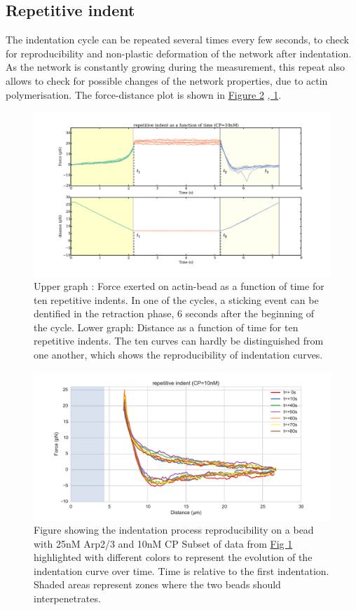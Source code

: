 \documentclass[A4paperpaper,11pt,english]{sphinxmanual}
\begin{document}
\subsection{Repetitive indent}
\label{index-latex:repetitive-indent}
The indentation cycle can be repeated several times every few seconds, to check for reproducibility and non-plastic deformation of the network after
indentation. As the network is constantly growing during the measurement, this
repeat also allows to check for possible changes of the network properties, due to actin
polymerisation. The force-distance plot is shown in \hyperref[index-latex:reproc]{Figure  \ref*{index-latex:reproc}} \hyperref[index-latex:reproc-time]{,  \ref*{index-latex:reproc-time}}.
\begin{figure}[htbp]
\centering
\capstart

\includegraphics[width=1.000\linewidth]{reproc-time.pdf}
\caption{Upper graph : Force exerted on actin-bead as a function of time for ten
repetitive indents. In one of the cycles, a sticking event can be dentified in the
retraction phase, 6 seconds after the beginning of the cycle. Lower graph:
Distance as a function of time for  ten repetitive indents. The ten curves
can hardly be distinguished from one another, which shows the
reproducibility of indentation curves.}\label{index-latex:reproc-time}\end{figure}
\begin{figure}[htbp]
\centering
\capstart

\includegraphics[width=0.800\linewidth]{reproc.pdf}
\caption{Figure showing the indentation process reproducibility on a bead with
25nM Arp2/3 and 10nM CP Subset of data from \hyperref[index-latex:reproc-time]{Fig  \ref*{index-latex:reproc-time}} highlighted
with different colors to represent the evolution of the indentation curve
over time.  Time is relative to the first indentation. Shaded areas represent
zones where the two beads should  interpenetrates.}\label{index-latex:reproc}\end{figure}
\end{document}
